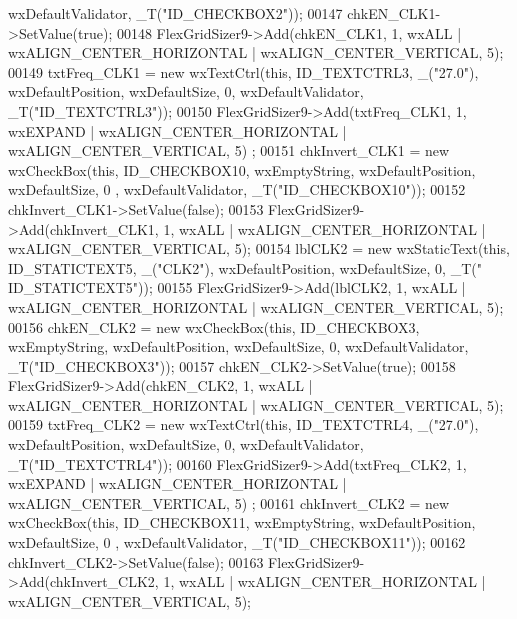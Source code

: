 \begin{DoxyCode}
      wxDefaultValidator, \_T(\textcolor{stringliteral}{"ID\_CHECKBOX2"}));
00147     chkEN\_CLK1->SetValue(\textcolor{keyword}{true});
00148     FlexGridSizer9->Add(chkEN\_CLK1, 1, wxALL | wxALIGN\_CENTER\_HORIZONTAL | wxALIGN\_CENTER\_VERTICAL, 5);
00149     txtFreq\_CLK1 = \textcolor{keyword}{new} wxTextCtrl(\textcolor{keyword}{this}, ID\_TEXTCTRL3, \_(\textcolor{stringliteral}{"27.0"}), wxDefaultPosition, wxDefaultSize, 0, 
      wxDefaultValidator, \_T(\textcolor{stringliteral}{"ID\_TEXTCTRL3"}));
00150     FlexGridSizer9->Add(txtFreq\_CLK1, 1, wxEXPAND | wxALIGN\_CENTER\_HORIZONTAL | wxALIGN\_CENTER\_VERTICAL, 5)
      ;
00151     chkInvert\_CLK1 = \textcolor{keyword}{new} wxCheckBox(\textcolor{keyword}{this}, ID\_CHECKBOX10, wxEmptyString, wxDefaultPosition, wxDefaultSize, 0
      , wxDefaultValidator, \_T(\textcolor{stringliteral}{"ID\_CHECKBOX10"}));
00152     chkInvert\_CLK1->SetValue(\textcolor{keyword}{false});
00153     FlexGridSizer9->Add(chkInvert\_CLK1, 1, wxALL | wxALIGN\_CENTER\_HORIZONTAL | wxALIGN\_CENTER\_VERTICAL, 5);
00154     lblCLK2 = \textcolor{keyword}{new} wxStaticText(\textcolor{keyword}{this}, ID\_STATICTEXT5, \_(\textcolor{stringliteral}{"CLK2"}), wxDefaultPosition, wxDefaultSize, 0, \_T(\textcolor{stringliteral}{"
      ID\_STATICTEXT5"}));
00155     FlexGridSizer9->Add(lblCLK2, 1, wxALL | wxALIGN\_CENTER\_HORIZONTAL | wxALIGN\_CENTER\_VERTICAL, 5);
00156     chkEN\_CLK2 = \textcolor{keyword}{new} wxCheckBox(\textcolor{keyword}{this}, ID\_CHECKBOX3, wxEmptyString, wxDefaultPosition, wxDefaultSize, 0, 
      wxDefaultValidator, \_T(\textcolor{stringliteral}{"ID\_CHECKBOX3"}));
00157     chkEN\_CLK2->SetValue(\textcolor{keyword}{true});
00158     FlexGridSizer9->Add(chkEN\_CLK2, 1, wxALL | wxALIGN\_CENTER\_HORIZONTAL | wxALIGN\_CENTER\_VERTICAL, 5);
00159     txtFreq\_CLK2 = \textcolor{keyword}{new} wxTextCtrl(\textcolor{keyword}{this}, ID\_TEXTCTRL4, \_(\textcolor{stringliteral}{"27.0"}), wxDefaultPosition, wxDefaultSize, 0, 
      wxDefaultValidator, \_T(\textcolor{stringliteral}{"ID\_TEXTCTRL4"}));
00160     FlexGridSizer9->Add(txtFreq\_CLK2, 1, wxEXPAND | wxALIGN\_CENTER\_HORIZONTAL | wxALIGN\_CENTER\_VERTICAL, 5)
      ;
00161     chkInvert\_CLK2 = \textcolor{keyword}{new} wxCheckBox(\textcolor{keyword}{this}, ID\_CHECKBOX11, wxEmptyString, wxDefaultPosition, wxDefaultSize, 0
      , wxDefaultValidator, \_T(\textcolor{stringliteral}{"ID\_CHECKBOX11"}));
00162     chkInvert\_CLK2->SetValue(\textcolor{keyword}{false});
00163     FlexGridSizer9->Add(chkInvert\_CLK2, 1, wxALL | wxALIGN\_CENTER\_HORIZONTAL | wxALIGN\_CENTER\_VERTICAL, 5);

\end{DoxyCode}
